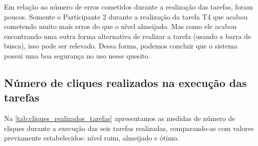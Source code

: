 Em relação ao número de erros cometidos durante a realização das tarefas, foram poucos. Somente o Participante 2 durante a realização da tarefa T4 que acabou cometendo muito mais erros do que o nível almeijado. Mas como ele acabou encontrando uma outra forma alternativa de realizar a tarefa (usando a barra de busca), isso pode ser relevado. Dessa forma, podemos concluir que o sistema possui uma boa segurança no uso nesse quesito. 

\subsection{Número de cliques realizados na execução das tarefas}
Na \autoref{tab:cliques_realizados_tarefas} apresentamos as medidas de número de cliques durante a execução das seis tarefas realizadas, comparando-as com valores previamente estabelecidos: nível ruim, almeijado e ótimo. 

\begin{table}[H]
\end{table}

